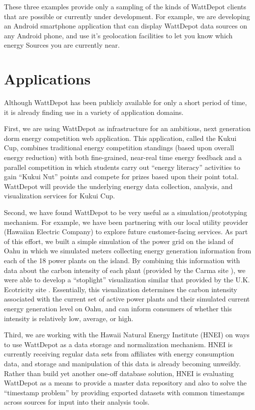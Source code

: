 \documentclass[conference,compsoc]{IEEEtran}
\begin{document}
These three examples provide only a sampling of the kinds of WattDepot
clients that are possible or currently under development. For example, we
are developing an Android smartphone application that can display
WattDepot data sources on any Android phone, and use it's geolocation
facilities to let you know which energy Sources you are currently near.

\section{Applications}

Although WattDepot has been publicly available for only a short period of
time, it is already finding use in a variety of application domains. 

First, we are using WattDepot as infrastructure for an ambitious, next
generation dorm energy competition web application.  This application,
called the Kukui Cup, combines traditional energy competition standings
(based upon overall energy reduction) with both fine-grained, near-real
time energy feedback and a parallel competition in which students carry out
``energy literacy'' activities to gain ``Kukui Nut'' points and compete for
prizes based upon their point total.  WattDepot will provide the underlying
energy data collection, analysis, and visualization services for Kukui Cup.

Second, we have found WattDepot to be very useful as a
simulation/prototyping mechanism.  For example, we have been partnering
with our local utility provider (Hawaiian Electric Company) to explore
future customer-facing services.  As part of this effort, we built a simple
simulation of the power grid on the island of Oahu in which we simulated
meters collecting energy
generation information from each of the 18 power plants on the island.  By
combining this information with data about the carbon intensity of each
plant (provided by the Carma site \cite{Carma}), we were able to develop a
``stoplight'' visualization similar that provided by the U.K. Ecotricity
site \cite{Ecotricity}.  Essentially, this visualization determines the
carbon intensity associated with the current set of active power plants and
their simulated current energy generation level on Oahu, and can inform
consumers of whether this intensity is relatively low, average, or high.

Third, we are working with the Hawaii Natural Energy Institute (HNEI) on
ways to use WattDepot as a data storage and normalization mechanism.  HNEI
is currently receiving regular data sets from affiliates with energy
consumption data, and storage and manipulation of this data is already
becoming unweildy. Rather than build yet another one-off database solution,
HNEI is evaluating WattDepot as a means to provide a master data repository
and also to solve the ``timestamp problem'' by providing exported datasets
with common timestamps across sources for input into their analysis tools.
\end{document}
